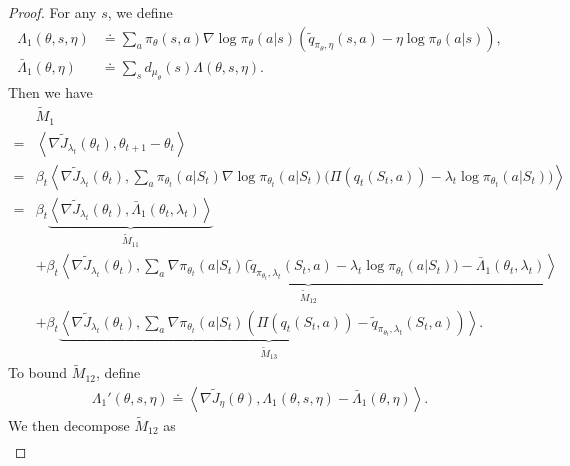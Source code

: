 \documentclass[twoside,11pt]{article}
\newcommand{\indot}[2]{{\left<#1, #2\right>}}
\numberwithin{assucounter}{section}
\begin{document}
\begin{proof}
  For any $s$, we define
  \begin{align}
    \label{eq actor helper function sac}
    \Lambda_1(\theta, s, \eta) &\doteq \sum_a \pi_\theta(s, a)  \nabla \log  \pi_\theta(a|s) \left(\tilde q_{\pi_\theta, \eta}(s, a) - \eta \log \pi_\theta(a | s) \right), \\
    \bar \Lambda_1(\theta, \eta) &\doteq \sum_{s} d_{\mu_\theta}(s) \Lambda(\theta, s, \eta).
  \end{align}
  Then we have
  \begin{align}
    &\tilde M_1 \\
    = &\indot{\nabla \tilde J_{\lambda_t}(\theta_t)}{\theta_{t+1} - \theta_t} \\
    =&\beta_t \indot{\nabla \tilde J_{\lambda_t}(\theta_t)}{ \sum_a \pi_{\theta_t}(a|S_t) \nabla \log \pi_{\theta_t}(a | S_t) \Big(\Pi (q_t(S_t, a)) - \lambda_t \log \pi_{\theta_t}(a |S_t) \Big)} \\
    =&\beta_t \underbrace{\indot{\nabla \tilde J_{\lambda_t}(\theta_t)}{\bar \Lambda_1(\theta_t, \lambda_t)}}_{\tilde M_{11}} \\
    &+ \beta_t \underbrace{\indot{\nabla \tilde J_{\lambda_t}(\theta_t)}{\sum_a \nabla \pi_{\theta_t}(a|S_t) \Big(\tilde q_{\pi_{\theta_t}, \lambda_t}(S_t, a) - \lambda_t \log \pi_{\theta_t}(a |S_t) \Big)  - \bar \Lambda_1(\theta_t, \lambda_t)}}_{\tilde M_{12}} \\
    &+ \beta_t \underbrace{\indot{\nabla \tilde J_{\lambda_t}(\theta_t)}{\sum_a \nabla \pi_{\theta_t}(a | S_t) \left( \Pi (q_t(S_t, a)) -  \tilde q_{\pi_{\theta_t}, \lambda_t}(S_t, a) \right)}}_{\tilde M_{13}}.
  \end{align}
  To bound $\tilde M_{12}$,
  define 
  \begin{align}
    \label{eq actor helper function 2 sac}
    \Lambda_1'(\theta, s, \eta) \doteq \indot{\nabla \tilde J_{\eta}(\theta)}{ \Lambda_1(\theta, s, \eta) - \bar \Lambda_1(\theta, \eta)}.
  \end{align}
  We then decompose $\tilde M_{12}$ as
  \begin{align}

\end{align}
\end{proof}
\end{document}
